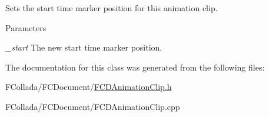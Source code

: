 \label{classFCDAnimationClip_aba58782b21762c1602022accfafce340}
Sets the start time marker position for this animation clip. 
\begin{DoxyParams}{Parameters}
\item[{\em \_\-start}]The new start time marker position. \end{DoxyParams}


The documentation for this class was generated from the following files:\begin{DoxyCompactItemize}
\item 
FCollada/FCDocument/\hyperlink{FCDAnimationClip_8h}{FCDAnimationClip.h}\item 
FCollada/FCDocument/FCDAnimationClip.cpp\end{DoxyCompactItemize}
